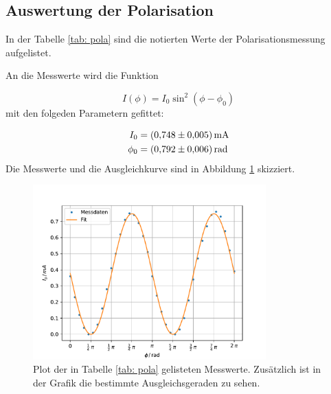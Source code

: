 \subsection{Auswertung der Polarisation}

In der Tabelle \ref{tab: pola} sind die notierten Werte der Polarisationsmessung
aufgelistet.
\FloatBarrier

An die Messwerte wird die Funktion

\begin{equation}
  \label{eq: func_polarisation}
  I(\phi)=I_0\sin^2\left(\phi-\phi_0\right)
\end{equation}
mit den folgeden Parametern gefittet:

\begin{align}
  \label{eq: fit_pola}
  \begin{aligned}
  I_0&=\SI{0.748\pm0.005}{\milli\ampere}\\
  \phi_0&=\SI{0.792\pm0.006}{\radian}
\end{aligned}
\end{align}
Die Messwerte und die Ausgleichkurve sind in Abbildung \ref{fig: pola} skizziert.

\begin{figure}[h!]
  \centering
  \includegraphics[width=0.8\textwidth]{../Messdaten/plots/pola.pdf}
  \caption{Plot der in Tabelle \ref{tab: pola} gelisteten Messwerte. Zusätzlich ist in der Grafik die bestimmte Ausgleichsgeraden zu sehen.}
  \label{fig: pola}
\end{figure}
\FloatBarrier

